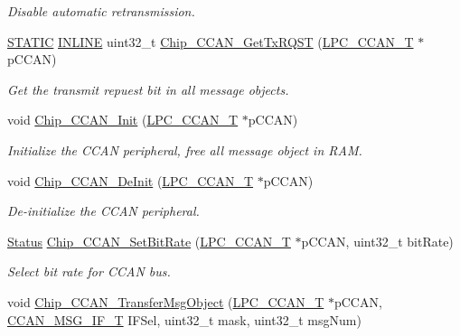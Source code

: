 \begin{DoxyCompactItemize}
\begin{DoxyCompactList}\small\item\em Disable automatic retransmission. \end{DoxyCompactList}\item 
\hyperlink{group___l_p_c___types___public___macros_ga10b2d890d871e1489bb02b7e70d9bdfb}{S\+T\+A\+T\+IC} \hyperlink{spifi__18xx__43xx_8h_a2eb6f9e0395b47b8d5e3eeae4fe0c116}{I\+N\+L\+I\+NE} uint32\+\_\+t \hyperlink{group___c_c_a_n__18_x_x__43_x_x_ga277f2c98eba48fdf57e8444d8f151782}{Chip\+\_\+\+C\+C\+A\+N\+\_\+\+Get\+Tx\+R\+Q\+ST} (\hyperlink{struct_l_p_c___c_c_a_n___t}{L\+P\+C\+\_\+\+C\+C\+A\+N\+\_\+T} $\ast$p\+C\+C\+AN)
\begin{DoxyCompactList}\small\item\em Get the transmit repuest bit in all message objects. \end{DoxyCompactList}\item 
void \hyperlink{group___c_c_a_n__18_x_x__43_x_x_ga8525e3ffe5b5b3f1cccd4ef0823db123}{Chip\+\_\+\+C\+C\+A\+N\+\_\+\+Init} (\hyperlink{struct_l_p_c___c_c_a_n___t}{L\+P\+C\+\_\+\+C\+C\+A\+N\+\_\+T} $\ast$p\+C\+C\+AN)
\begin{DoxyCompactList}\small\item\em Initialize the C\+C\+AN peripheral, free all message object in R\+AM. \end{DoxyCompactList}\item 
void \hyperlink{group___c_c_a_n__18_x_x__43_x_x_ga480bb72b3278473a3946718e6c54917b}{Chip\+\_\+\+C\+C\+A\+N\+\_\+\+De\+Init} (\hyperlink{struct_l_p_c___c_c_a_n___t}{L\+P\+C\+\_\+\+C\+C\+A\+N\+\_\+T} $\ast$p\+C\+C\+AN)
\begin{DoxyCompactList}\small\item\em De-\/initialize the C\+C\+AN peripheral. \end{DoxyCompactList}\item 
\hyperlink{group___l_p_c___types___public___types_ga67a0db04d321a74b7e7fcfd3f1a3f70b}{Status} \hyperlink{group___c_c_a_n__18_x_x__43_x_x_ga5174d447093a6f3854255a97ae222a85}{Chip\+\_\+\+C\+C\+A\+N\+\_\+\+Set\+Bit\+Rate} (\hyperlink{struct_l_p_c___c_c_a_n___t}{L\+P\+C\+\_\+\+C\+C\+A\+N\+\_\+T} $\ast$p\+C\+C\+AN, uint32\+\_\+t bit\+Rate)
\begin{DoxyCompactList}\small\item\em Select bit rate for C\+C\+AN bus. \end{DoxyCompactList}\item 
void \hyperlink{group___c_c_a_n__18_x_x__43_x_x_gaf3ac11ce8aadaefebd96a7f6ffcb7a1f}{Chip\+\_\+\+C\+C\+A\+N\+\_\+\+Transfer\+Msg\+Object} (\hyperlink{struct_l_p_c___c_c_a_n___t}{L\+P\+C\+\_\+\+C\+C\+A\+N\+\_\+T} $\ast$p\+C\+C\+AN, \hyperlink{group___c_c_a_n__18_x_x__43_x_x_gac90da0138c430750d2d7d55d4448cae7}{C\+C\+A\+N\+\_\+\+M\+S\+G\+\_\+\+I\+F\+\_\+T} I\+F\+Sel, uint32\+\_\+t mask, uint32\+\_\+t msg\+Num)

\end{DoxyCompactItemize}
